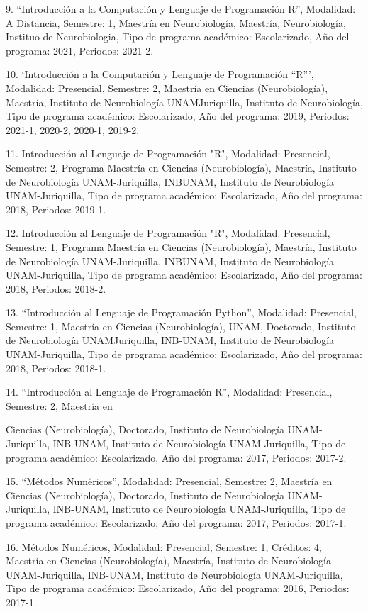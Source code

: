 9. “Introducción a la Computación y Lenguaje de Programación R”, Modalidad: A Distancia, Semestre: 
1, Maestría en Neurobiología, Maestría, Neurobiología, Instituo de Neurobiologia, Tipo de programa 
académico: Escolarizado, Año del programa: 2021, Periodos: 2021-2.

10. ‘Introducción a la Computación y Lenguaje de Programación “R”’, Modalidad: Presencial, Semestre: 
2, Maestría en Ciencias (Neurobiología), Maestría, Instituto de Neurobiología UNAMJuriquilla, 
Instituto de Neurobiología, Tipo de programa académico: Escolarizado, Año del programa: 2019, 
Periodos: 2021-1, 2020-2, 2020-1, 2019-2.

11. Introducción al Lenguaje de Programación "R", Modalidad: Presencial, Semestre: 2, Programa 
Maestría en Ciencias (Neurobiología), Maestría, Instituto de Neurobiología UNAM-Juriquilla, INBUNAM, 
Instituto de Neurobiología UNAM-Juriquilla, Tipo de programa académico: Escolarizado, Año del 
programa: 2018, Periodos: 2019-1.

12. Introducción al Lenguaje de Programación "R", Modalidad: Presencial, Semestre: 1, Programa 
Maestría en Ciencias (Neurobiología), Maestría, Instituto de Neurobiología UNAM-Juriquilla, INBUNAM, 
Instituto de Neurobiología UNAM-Juriquilla, Tipo de programa académico: Escolarizado, Año del 
programa: 2018, Periodos: 2018-2.

13. “Introducción al Lenguaje de Programación Python”, Modalidad: Presencial, Semestre: 1, Maestría 
en Ciencias (Neurobiología), UNAM, Doctorado, Instituto de Neurobiología UNAMJuriquilla, INB-UNAM, 
Instituto de Neurobiología UNAM-Juriquilla, Tipo de programa académico: Escolarizado, Año del 
programa: 2018, Periodos: 2018-1.

14. “Introducción al Lenguaje de Programación R”, Modalidad: Presencial, Semestre: 2, Maestría en

Ciencias (Neurobiología), Doctorado, Instituto de Neurobiología UNAM-Juriquilla, INB-UNAM, Instituto 
de Neurobiología UNAM-Juriquilla, Tipo de programa académico: Escolarizado, Año del programa: 2017, 
Periodos: 2017-2.

15. “Métodos Numéricos”, Modalidad: Presencial, Semestre: 2, Maestría en Ciencias (Neurobiología), 
Doctorado, Instituto de Neurobiología UNAM-Juriquilla, INB-UNAM, Instituto de Neurobiología 
UNAM-Juriquilla, Tipo de programa académico: Escolarizado, Año del programa: 2017, Periodos: 2017-1.

16. Métodos Numéricos, Modalidad: Presencial, Semestre: 1, Créditos: 4, Maestría en Ciencias 
(Neurobiología), Maestría, Instituto de Neurobiología UNAM-Juriquilla, INB-UNAM, Instituto de 
Neurobiología UNAM-Juriquilla, Tipo de programa académico: Escolarizado, Año del programa: 2016, 
Periodos: 2017-1.

